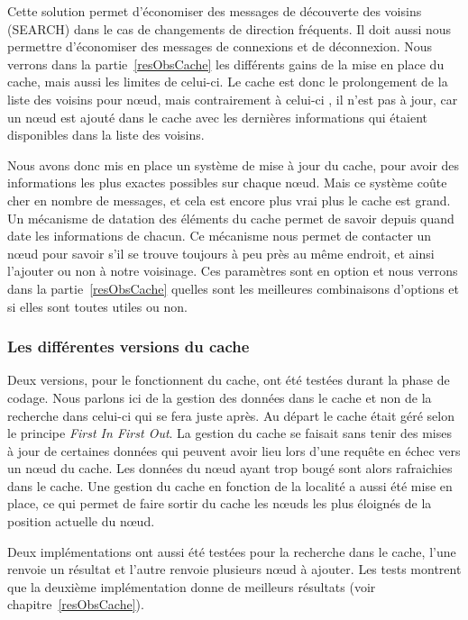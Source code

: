 \par Cette solution permet d'économiser des messages de découverte des voisins (SEARCH) dans le cas de changements de direction fréquents. Il doit aussi nous permettre d'économiser des messages de connexions et de déconnexion. Nous verrons dans la partie~\ref{resObsCache} les différents gains de la mise en place du cache, mais aussi les limites de celui-ci. Le cache est donc le prolongement de la liste des voisins pour nœud, mais contrairement à celui-ci , il n'est pas à jour, car un nœud est ajouté dans le cache avec les dernières informations qui étaient disponibles dans la liste des voisins. 
\par Nous avons donc mis en place un système de mise à jour du cache, pour avoir des informations les plus exactes possibles sur chaque nœud. Mais ce système coûte cher en nombre de messages, et cela est encore plus vrai plus le cache est grand. Un mécanisme de datation des éléments du cache permet de savoir depuis quand date les informations de chacun. Ce mécanisme nous permet de contacter un nœud pour savoir s'il se trouve toujours à peu près au même endroit, et ainsi l'ajouter ou non à notre voisinage. Ces paramètres sont en option et nous verrons dans la partie~\ref{resObsCache} quelles sont les meilleures combinaisons d'options et si elles sont toutes utiles ou non.

\subsubsection{Les différentes versions du cache}

Deux versions, pour le fonctionnent du cache, ont été testées durant la phase de codage. Nous parlons ici de la gestion des données dans le cache et non de la recherche dans celui-ci qui se fera juste après. Au départ le cache était géré selon le principe \textit{First In First Out}. La gestion du cache se faisait sans tenir des mises à jour de certaines données qui peuvent avoir lieu lors d'une requête en échec vers un nœud du cache. Les données du nœud ayant trop bougé sont alors rafraichies dans le cache. Une gestion du cache en fonction de la localité a aussi été mise en place, ce qui permet de faire sortir du cache les nœuds les plus éloignés de la position actuelle du nœud.
\par Deux implémentations ont aussi été testées pour la recherche dans le cache, l'une renvoie un résultat et l'autre renvoie plusieurs nœud à ajouter. Les tests montrent que la deuxième implémentation donne de meilleurs résultats (voir chapitre~\ref{resObsCache}).


